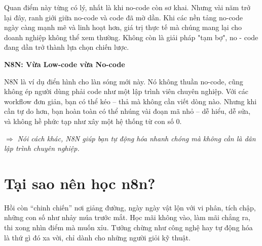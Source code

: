Quan điểm này từng có lý, nhất là khi no-code còn sơ khai. Nhưng vài năm trở lại đây, ranh giới giữa no-code và code đã mờ dần. Khi các nền tảng no-code ngày càng mạnh mẽ và linh hoạt hơn, giá trị thực tế mà chúng mang lại cho doanh nghiệp không thể xem thường. Không còn là giải pháp "tạm bợ", no - code đang dần trở thành lựa chọn chiến lược.


\textbf{N8N: Vừa Low-code vừa No-code}

N8N là ví dụ điển hình cho làn sóng mới này. Nó không thuần no-code, cũng không ép người dùng phải code như một lập trình viên chuyên nghiệp. Với các workflow đơn giản, bạn có thể kéo – thả mà không cần viết dòng nào. Nhưng khi cần tự do hơn, bạn hoàn toàn có thể nhúng vài đoạn mã nhỏ – dễ hiểu, dễ sửa, và không hề phức tạp như xây một hệ thống từ con số 0.

$\Rightarrow$ \textit{Nói cách khác, N8N giúp bạn tự động hóa nhanh chóng mà không cần là dân lập trình chuyên nghiệp.}




\newpage
\section{Tại sao nên học n8n?}

Hồi còn “chinh chiến” nơi giảng đường, ngày ngày vật lộn với vi phân, tích chập, những con số như nhảy múa trước mắt. Học mãi không vào, làm mãi chẳng ra, thi xong nhìn điểm mà muốn xỉu. Tưởng chừng như công nghệ hay tự động hóa là thứ gì đó xa vời, chỉ dành cho những người giỏi kỹ thuật.


